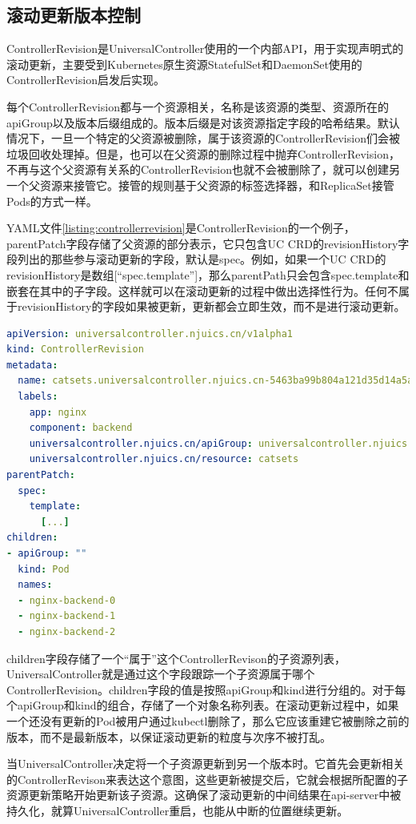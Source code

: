 \documentclass[macfonts,master]{njuthesis}
\begin{document}
\subsection{滚动更新版本控制}\label{section:rolling-control}
ControllerRevision是UniversalController使用的一个内部API，用于实现声明式的滚动更新，主要受到Kubernetes原生资源StatefulSet和DaemonSet使用的ControllerRevision启发后实现。

每个ControllerRevision都与一个资源相关，名称是该资源的类型、资源所在的apiGroup以及版本后缀组成的。版本后缀是对该资源指定字段的哈希结果。默认情况下，一旦一个特定的父资源被删除，属于该资源的ControllerRevision们会被垃圾回收处理掉。但是，也可以在父资源的删除过程中抛弃ControllerRevision，不再与这个父资源有关系的ControllerRevision也就不会被删除了，就可以创建另一个父资源来接管它。接管的规则基于父资源的标签选择器，和ReplicaSet接管Pods的方式一样。

YAML文件\ref{listing:controllerrevision}是ControllerRevision的一个例子，parentPatch字段存储了父资源的部分表示，它只包含UC CRD的revisionHistory字段列出的那些参与滚动更新的字段，默认是spec。例如，如果一个UC CRD的revisionHistory是数组[``spec.template'']，那么parentPath只会包含spec.template和嵌套在其中的子字段。这样就可以在滚动更新的过程中做出选择性行为。任何不属于revisionHistory的字段如果被更新，更新都会立即生效，而不是进行滚动更新。
\newpage
\begin{lstlisting}[language=yaml,caption=ControllerRevision示例,label=listing:controllerrevision]
apiVersion: universalcontroller.njuics.cn/v1alpha1
kind: ControllerRevision
metadata:
  name: catsets.universalcontroller.njuics.cn-5463ba99b804a121d35d14a5ab74546d1e8ba953
  labels:
    app: nginx
    component: backend
    universalcontroller.njuics.cn/apiGroup: universalcontroller.njuics.cn
    universalcontroller.njuics.cn/resource: catsets
parentPatch:
  spec:
    template:
      [...]
children:
- apiGroup: ""
  kind: Pod
  names:
  - nginx-backend-0
  - nginx-backend-1
  - nginx-backend-2
\end{lstlisting}


children字段存储了一个``属于''这个ControllerRevison的子资源列表，UniversalController就是通过这个字段跟踪一个子资源属于哪个ControllerRevision。children字段的值是按照apiGroup和kind进行分组的。对于每个apiGroup和kind的组合，存储了一个对象名称列表。在滚动更新过程中，如果一个还没有更新的Pod被用户通过kubectl删除了，那么它应该重建它被删除之前的版本，而不是最新版本，以保证滚动更新的粒度与次序不被打乱。

当UniversalController决定将一个子资源更新到另一个版本时。它首先会更新相关的ControllerRevison来表达这个意图，这些更新被提交后，它就会根据所配置的子资源更新策略开始更新该子资源。这确保了滚动更新的中间结果在api-server中被持久化，就算UniversalController重启，也能从中断的位置继续更新。
\end{document}
